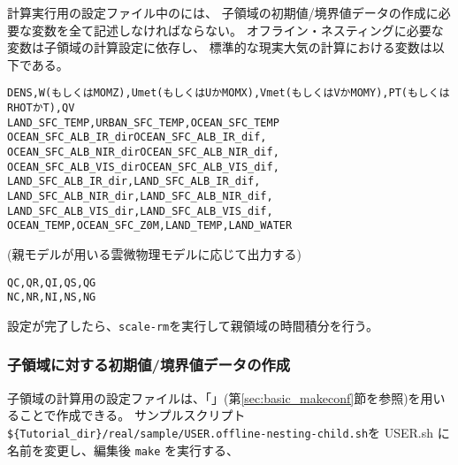 計算実行用の設定ファイル中のには、
子領域の初期値/境界値データの作成に必要な変数を全て記述しなければならない。
オフライン・ネスティングに必要な変数は子領域の計算設定に依存し、
標準的な現実大気の計算における変数は以下である。
\begin{alltt}
  DENS, W (もしくは MOMZ), Umet (もしくは U か MOMX), Vmet (もしくは V か MOMY), PT (もしくは RHOT か T), QV
  LAND_SFC_TEMP, URBAN_SFC_TEMP, OCEAN_SFC_TEMP
  OCEAN_SFC_ALB_IR_dir OCEAN_SFC_ALB_IR_dif,
  OCEAN_SFC_ALB_NIR_dir OCEAN_SFC_ALB_NIR_dif,
  OCEAN_SFC_ALB_VIS_dir OCEAN_SFC_ALB_VIS_dif,
  LAND_SFC_ALB_IR_dir, LAND_SFC_ALB_IR_dif,
  LAND_SFC_ALB_NIR_dir, LAND_SFC_ALB_NIR_dif,
  LAND_SFC_ALB_VIS_dir, LAND_SFC_ALB_VIS_dif,
  OCEAN_TEMP, OCEAN_SFC_Z0M, LAND_TEMP, LAND_WATER
\end{alltt}
(親モデルが用いる雲微物理モデルに応じて出力する)
\begin{alltt}
  QC, QR, QI, QS, QG
  NC, NR, NI, NS, NG
\end{alltt}
設定が完了したら、\verb|scale-rm|を実行して親領域の時間積分を行う。

\subsubsection{子領域に対する初期値/境界値データの作成}

子領域の計算用の設定ファイルは、「\makeconftool」(第\ref{sec:basic_makeconf}節を参照)を用いることで作成できる。
サンプルスクリプト\verb|${Tutorial_dir}/real/sample/USER.offline-nesting-child.sh|を USER.sh に名前を変更し、編集後 \verb|make| を実行する、

